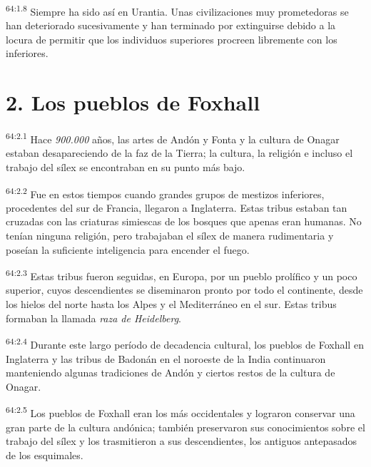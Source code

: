 \par
\textsuperscript{64:1.8} Siempre ha sido así en Urantia. Unas civilizaciones muy prometedoras se han deteriorado sucesivamente y han terminado por extinguirse debido a la locura de permitir que los individuos superiores procreen libremente con los inferiores.

\section*{2. Los pueblos de Foxhall}
\par
\textsuperscript{64:2.1} Hace \textit{900.000} años, las artes de Andón y Fonta y la cultura de Onagar estaban desapareciendo de la faz de la Tierra; la cultura, la religión e incluso el trabajo del sílex se encontraban en su punto más bajo.

\par
\textsuperscript{64:2.2} Fue en estos tiempos cuando grandes grupos de mestizos inferiores, procedentes del sur de Francia, llegaron a Inglaterra. Estas tribus estaban tan cruzadas con las criaturas simiescas de los bosques que apenas eran humanas. No tenían ninguna religión, pero trabajaban el sílex de manera rudimentaria y poseían la suficiente inteligencia para encender el fuego.

\par
\textsuperscript{64:2.3} Estas tribus fueron seguidas, en Europa, por un pueblo prolífico y un poco superior, cuyos descendientes se diseminaron pronto por todo el continente, desde los hielos del norte hasta los Alpes y el Mediterráneo en el sur. Estas tribus formaban la llamada \textit{raza de Heidelberg}.

\par
\textsuperscript{64:2.4} Durante este largo período de decadencia cultural, los pueblos de Foxhall en Inglaterra y las tribus de Badonán en el noroeste de la India continuaron manteniendo algunas tradiciones de Andón y ciertos restos de la cultura de Onagar.

\par
\textsuperscript{64:2.5} Los pueblos de Foxhall eran los más occidentales y lograron conservar una gran parte de la cultura andónica; también preservaron sus conocimientos sobre el trabajo del sílex y los trasmitieron a sus descendientes, los antiguos antepasados de los esquimales.

